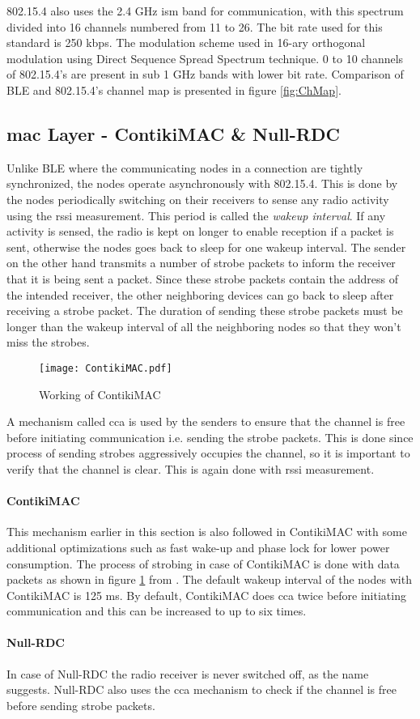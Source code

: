 802.15.4 also uses the 2.4 GHz \gls{ism} band for communication, with this spectrum divided into 16 channels numbered from 11 to 26. The bit rate used for this standard is 250 kbps. The modulation scheme used in 16-ary orthogonal modulation using Direct Sequence Spread Spectrum technique. 0 to 10 channels of 802.15.4's are present in sub 1 GHz bands with lower bit rate. Comparison of BLE and 802.15.4's channel map is presented in figure \ref{fig:ChMap}.

\subsection{\texorpdfstring{\gls{mac}}{MAC} Layer - ContikiMAC \& Null-RDC}

Unlike BLE where the communicating nodes in a connection are tightly synchronized, the nodes operate asynchronously with 802.15.4. This is done by the nodes periodically switching on their receivers to sense any radio activity using the \gls{rssi} measurement. This period is called the \emph{wakeup interval}. If any activity is sensed, the radio is kept on longer to enable reception if a packet is sent, otherwise the nodes goes back to sleep for
one wakeup interval. The sender on the other hand transmits a number of strobe packets to inform the receiver that it is being sent a packet. Since these strobe packets contain the address of the intended receiver, the other neighboring devices can go back to sleep after receiving a strobe packet. The duration of sending these strobe packets must be longer than the wakeup interval of all the neighboring nodes so that they won't miss the strobes.

\begin{figure}[b]
\centering
\texttt{[image: ContikiMAC.pdf]}
\caption{Working of ContikiMAC  \cite{Dunkels2011}}
\label{fig:ContikiMAC}
\end{figure}

A mechanism called \gls{cca} is used by the senders to ensure that the channel is free before initiating communication i.e. sending the strobe packets. This is done since process of sending strobes aggressively occupies the channel, so it is important to verify that the channel is clear. This is again done with \gls{rssi} measurement.

\paragraph{ContikiMAC}
This mechanism earlier in this section is also followed in ContikiMAC with some additional optimizations such as fast wake-up and phase lock for lower power consumption. The process of strobing in case of ContikiMAC is done with data packets as shown in figure \ref{fig:ContikiMAC} from  \cite{Dunkels2011}. The default wakeup interval of the nodes with ContikiMAC is 125 ms. By default, ContikiMAC does \gls{cca} twice before initiating communication and this can be increased to up to six times.

\paragraph{Null-RDC}
In case of Null-RDC the radio receiver is never switched off, as the name suggests. Null-RDC also uses the \gls{cca} mechanism to check if the channel is free before sending strobe packets.
